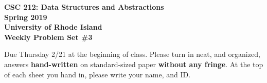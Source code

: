 \documentclass[11pt]{article}
\begin{document}
\thispagestyle{empty}

\begin{center}
    {\Large\bf CSC 212: Data Structures and Abstractions}\\
    \medskip
    {\Large\bf Spring 2019}\\
    \medskip
    {\Large\bf University of Rhode Island}\\
    \bigskip
    {\Large\bf Weekly Problem Set \#3}
\end{center}

Due Thursday 2/21 at the beginning of class. Please turn in neat, and organized, answers \textbf{hand-written} on standard-sized paper \textbf{without any fringe}. At the top of each sheet you hand in, please write your name, and ID.
\end{document}
